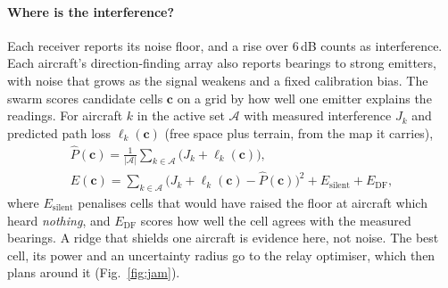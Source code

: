\documentclass[10pt,a4paper,twocolumn]{article}
\begin{document}
\paragraph{Where is the interference?} Each receiver reports its noise floor, and a rise over 6\,dB counts as interference. Each aircraft's direction-finding array also reports bearings to strong emitters, with noise that grows as the signal weakens and a fixed calibration bias. The swarm scores candidate cells $\mathbf c$ on a grid by how well one emitter explains the readings. For aircraft $k$ in the active set $\mathcal A$ with measured interference $J_k$ and predicted path loss $\ell_k(\mathbf c)$ (free space plus terrain, from the map it carries),
\begin{equation}
\begin{gathered}
\hat P(\mathbf c)=\frac{1}{|\mathcal A|}\sum_{k\in\mathcal A}\big(J_k+\ell_k(\mathbf c)\big),\\
E(\mathbf c)=\sum_{k\in\mathcal A}\big(J_k+\ell_k(\mathbf c)-\hat P(\mathbf c)\big)^2+E_{\mathrm{silent}}+E_{\mathrm{DF}},
\end{gathered}
\label{eq:loc}
\end{equation}
where $E_{\mathrm{silent}}$ penalises cells that would have raised the floor at aircraft which heard \emph{nothing}, and $E_{\mathrm{DF}}$ scores how well the cell agrees with the measured bearings. A ridge that shields one aircraft is evidence here, not noise. The best cell, its power and an uncertainty radius go to the relay optimiser, which then plans around it (Fig.~\ref{fig:jam}).
\end{document}
